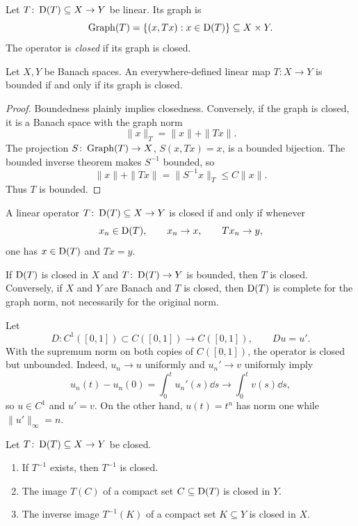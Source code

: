 \begin{notedefinition}
Let $T\colon\operatorname{D}(T)\subseteq X\to Y$ be linear.  Its graph is
\[
  \operatorname{Graph}(T)=\{(x,Tx):x\in\operatorname{D}(T)\}\subseteq X\times Y.
\]
The operator is \emph{closed} if its graph is closed.
\end{notedefinition}

\begin{notetheorem}
Let $X,Y$ be Banach spaces.  An everywhere-defined linear map
$T\colon X\to Y$ is bounded if and only if its graph is closed.
\end{notetheorem}

\begin{proof}
Boundedness plainly implies closedness.  Conversely, if the graph is closed,
it is a Banach space with the graph norm
\[
  \|x\|_T=\|x\|+\|Tx\|.
\]
The projection $S\colon\operatorname{Graph}(T)\to X$, $S(x,Tx)=x$, is a bounded bijection.
The bounded inverse theorem makes $S^{-1}$ bounded, so
\[
  \|x\|+\|Tx\|=\|S^{-1}x\|_T\le C\|x\|.
\]
Thus $T$ is bounded.
\end{proof}

\begin{notetheorem}
A linear operator $T\colon\operatorname{D}(T)\subseteq X\to Y$ is closed if and only if
whenever
\[
  x_n\in\operatorname{D}(T),
  \qquad
  x_n\to x,
  \qquad
  Tx_n\to y,
\]
one has $x\in\operatorname{D}(T)$ and $Tx=y$.
\end{notetheorem}

\begin{notetheorem}
If $\operatorname{D}(T)$ is closed in $X$ and $T\colon\operatorname{D}(T)\to Y$ is bounded, then
$T$ is closed.  Conversely, if $X$ and $Y$ are Banach and $T$ is closed,
then $\operatorname{D}(T)$ is complete for the graph norm, not necessarily for the
original norm.
\end{notetheorem}

\begin{noteexample}[Differentiation]
Let
\[
  D\colon C^1([0,1])\subset C([0,1])\to C([0,1]),
  \qquad Du=u'.
\]
With the supremum norm on both copies of $C([0,1])$, the operator is closed
but unbounded.  Indeed, $u_n\to u$ uniformly and $u_n'\to v$ uniformly imply
\[
  u_n(t)-u_n(0)=\int_0^tu_n'(s)\dd s
  \longrightarrow\int_0^tv(s)\dd s,
\]
so $u\in C^1$ and $u'=v$.  On the other hand,
$u(t)=t^n$ has norm one while $\|u'\|_\infty=n$.
\end{noteexample}

\begin{noteexercise}
Let $T\colon\operatorname{D}(T)\subseteq X\to Y$ be closed.
\begin{enumerate}
  \item If $T^{-1}$ exists, then $T^{-1}$ is closed.
  \item The image $T(C)$ of a compact set $C\subseteq\operatorname{D}(T)$ is closed in
        $Y$.
  \item The inverse image $T^{-1}(K)$ of a compact set $K\subseteq Y$ is
        closed in $X$.
\end{enumerate}
\end{noteexercise}

